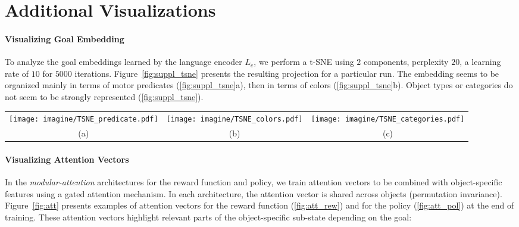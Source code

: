 \begin{itemize}
\end{itemize}

\clearpage
\section{Additional Visualizations}
\label{sec:suppl_visu}

\paragraph{Visualizing Goal Embedding }

To analyze the goal embeddings learned by the language encoder $L_e$, we perform a t-SNE using $2$ components, perplexity $20$, a learning rate of $10$ for $5000$ iterations. Figure~\ref{fig:suppl_tsne} presents the resulting projection for a particular run. The embedding seems to be organized mainly in terms of motor predicates (\ref{fig:suppl_tsne}a), then in terms of colors (\ref{fig:suppl_tsne}b). Object types or categories do not seem to be strongly represented (\ref{fig:suppl_tsne}). 

\begin{figure*}[!hb]
  \centering
  \begin{tabular}{ccc}
  	\texttt{[image: imagine/TSNE\_predicate.pdf]} & \texttt{[image: imagine/TSNE\_colors.pdf]} & 
  	\texttt{[image: imagine/TSNE\_categories.pdf]} \\
  	(a) & (b) & (c)
  \end{tabular}

  \caption{\textbf{t-SNE of Goal Embedding.} The same t-SNE is presented, with different color codes (a) predicates, (b) colors, (c) object categories.}
  \label{fig:suppl_tsne}
\end{figure*}   

\paragraph{Visualizing Attention Vectors}

In the \textit{modular-attention} architectures for the reward function and policy, we train attention vectors to be combined with object-specific features using a gated attention mechanism. In each architecture, the attention vector is shared across objects (permutation invariance). Figure~\ref{fig:att} presents examples of attention vectors for the reward function (\ref{fig:att_rew}) and for the policy (\ref{fig:att_pol}) at the end of training. These attention vectors highlight relevant parts of the object-specific sub-state depending on the \NL  goal:

